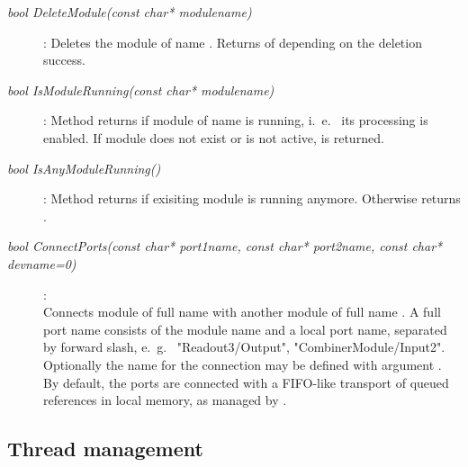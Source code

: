 \begin{description}
\item[\em bool DeleteModule\small (const char* modulename)] :
Deletes the module of name . Returns  of  
 depending on the deletion success.

\item[\em bool IsModuleRunning\small (const char* modulename)] :
Method returns  if module of name 
is running, i.~e.~ its processing is enabled. If module does not exist
or is not active,  is returned. 
         
\item[\em bool IsAnyModuleRunning()] :
Method returns  if  exisiting module is running anymore.
Otherwise returns .

\item[\em bool ConnectPorts\small (const char* port1name,
                           const char* port2name,
                           const char* devname=0)] :
 \\
Connects module  of full name 
with another  module  of full name .
A full port name consists of the module name and a local port name,
separated by forward slash, e.~g.~ "Readout3/Output", "CombinerModule/Input2".
Optionally the  name for the connection may
be defined with argument . By default, the ports are connected
with a FIFO-like transport of queued  references in local memory,
as managed by .			   
			   
\end{description}

\subsection{Thread management}	

